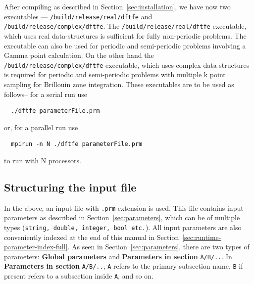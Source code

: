 After compiling \dftfe{} as described in Section~\ref{sec:installation}, we have now two executables --- \verb|/build/release/real/dftfe| and \verb|/build/release/complex/dftfe|. The \verb|/build/release/real/dftfe| executable, which uses real data-structures is sufficient for fully non-periodic problems. The executable can also be used for periodic and semi-periodic problems involving a Gamma point calculation. On the other hand the \verb|/build/release/complex/dftfe| executable, which uses complex data-structures is required for periodic and semi-periodic problems with multiple k point sampling for Brillouin zone integration. These executables are to be used as follows-- for a serial run use
\begin{verbatim}
  ./dftfe parameterFile.prm
\end{verbatim}
or, for a parallel run use
\begin{verbatim}
  mpirun -n N ./dftfe parameterFile.prm
\end{verbatim}
to run with N processors. 
\subsection{Structuring the input file}
In the above, an input file with \verb|.prm| extension is used. This file contains input parameters as described in Section~\ref{sec:parameters}, which can be of multiple types (\verb|string, double, integer, bool etc.|). All input parameters are also conveniently indexed at the end of this manual in Section~\ref{sec:runtime-parameter-index-full}. As seen in Section~\ref{sec:parameters}, there are two types of parameters: {\bf Global parameters} and {\bf Parameters in section} \verb|A/B/..|. In {\bf Parameters in section} \verb|A/B/..|, \verb|A| refers to the primary subsection name, \verb|B| if present refers to a subsection inside \verb|A|, and so on. 


